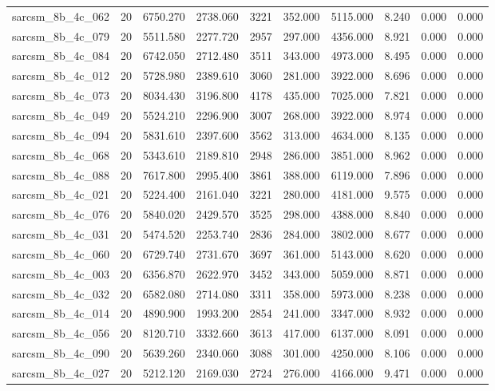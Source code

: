 \begin{tabular}{lrrrrrrrrr}
sarcsm\_8b\_4c\_062 & 20 & 6750.270 & 2738.060 & 3221 & 352.000 & 5115.000 & 8.240 & 0.000 & 0.000 \\
sarcsm\_8b\_4c\_079 & 20 & 5511.580 & 2277.720 & 2957 & 297.000 & 4356.000 & 8.921 & 0.000 & 0.000 \\
sarcsm\_8b\_4c\_084 & 20 & 6742.050 & 2712.480 & 3511 & 343.000 & 4973.000 & 8.495 & 0.000 & 0.000 \\
sarcsm\_8b\_4c\_012 & 20 & 5728.980 & 2389.610 & 3060 & 281.000 & 3922.000 & 8.696 & 0.000 & 0.000 \\
sarcsm\_8b\_4c\_073 & 20 & 8034.430 & 3196.800 & 4178 & 435.000 & 7025.000 & 7.821 & 0.000 & 0.000 \\
sarcsm\_8b\_4c\_049 & 20 & 5524.210 & 2296.900 & 3007 & 268.000 & 3922.000 & 8.974 & 0.000 & 0.000 \\
sarcsm\_8b\_4c\_094 & 20 & 5831.610 & 2397.600 & 3562 & 313.000 & 4634.000 & 8.135 & 0.000 & 0.000 \\
sarcsm\_8b\_4c\_068 & 20 & 5343.610 & 2189.810 & 2948 & 286.000 & 3851.000 & 8.962 & 0.000 & 0.000 \\
sarcsm\_8b\_4c\_088 & 20 & 7617.800 & 2995.400 & 3861 & 388.000 & 6119.000 & 7.896 & 0.000 & 0.000 \\
sarcsm\_8b\_4c\_021 & 20 & 5224.400 & 2161.040 & 3221 & 280.000 & 4181.000 & 9.575 & 0.000 & 0.000 \\
sarcsm\_8b\_4c\_076 & 20 & 5840.020 & 2429.570 & 3525 & 298.000 & 4388.000 & 8.840 & 0.000 & 0.000 \\
sarcsm\_8b\_4c\_031 & 20 & 5474.520 & 2253.740 & 2836 & 284.000 & 3802.000 & 8.677 & 0.000 & 0.000 \\
sarcsm\_8b\_4c\_060 & 20 & 6729.740 & 2731.670 & 3697 & 361.000 & 5143.000 & 8.620 & 0.000 & 0.000 \\
sarcsm\_8b\_4c\_003 & 20 & 6356.870 & 2622.970 & 3452 & 343.000 & 5059.000 & 8.871 & 0.000 & 0.000 \\
sarcsm\_8b\_4c\_032 & 20 & 6582.080 & 2714.080 & 3311 & 358.000 & 5973.000 & 8.238 & 0.000 & 0.000 \\
sarcsm\_8b\_4c\_014 & 20 & 4890.900 & 1993.200 & 2854 & 241.000 & 3347.000 & 8.932 & 0.000 & 0.000 \\
sarcsm\_8b\_4c\_056 & 20 & 8120.710 & 3332.660 & 3613 & 417.000 & 6137.000 & 8.091 & 0.000 & 0.000 \\
sarcsm\_8b\_4c\_090 & 20 & 5639.260 & 2340.060 & 3088 & 301.000 & 4250.000 & 8.106 & 0.000 & 0.000 \\
sarcsm\_8b\_4c\_027 & 20 & 5212.120 & 2169.030 & 2724 & 276.000 & 4166.000 & 9.471 & 0.000 & 0.000 \\

\end{tabular}
